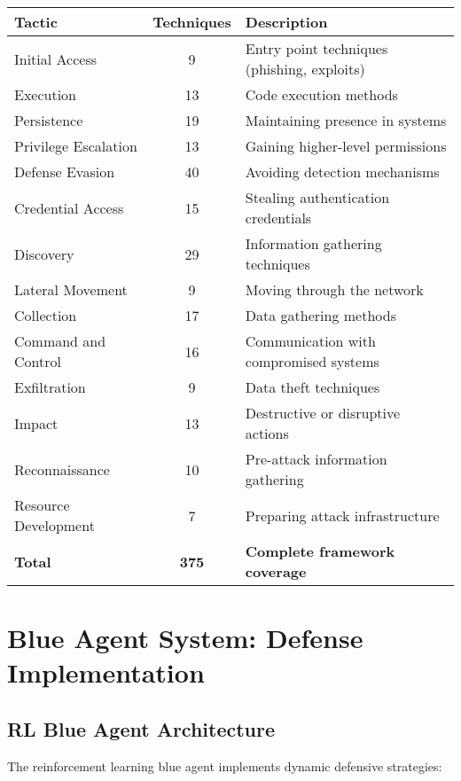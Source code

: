 \documentclass[12pt,a4paper]{article}
\begin{document}
\begin{center}
\begin{longtable}{|l|c|p{8cm}|}
\hline
\textbf{Tactic} & \textbf{Techniques} & \textbf{Description} \\
\hline
Initial Access & 9 & Entry point techniques (phishing, exploits) \\
Execution & 13 & Code execution methods \\
Persistence & 19 & Maintaining presence in systems \\
Privilege Escalation & 13 & Gaining higher-level permissions \\
Defense Evasion & 40 & Avoiding detection mechanisms \\
Credential Access & 15 & Stealing authentication credentials \\
Discovery & 29 & Information gathering techniques \\
Lateral Movement & 9 & Moving through the network \\
Collection & 17 & Data gathering methods \\
Command and Control & 16 & Communication with compromised systems \\
Exfiltration & 9 & Data theft techniques \\
Impact & 13 & Destructive or disruptive actions \\
Reconnaissance & 10 & Pre-attack information gathering \\
Resource Development & 7 & Preparing attack infrastructure \\
\hline
\textbf{Total} & \textbf{375} & \textbf{Complete framework coverage} \\
\hline
\end{longtable}
\end{center}

\section{Blue Agent System: Defense Implementation}

\subsection{RL Blue Agent Architecture}

The reinforcement learning blue agent implements dynamic defensive strategies:
\end{document}
